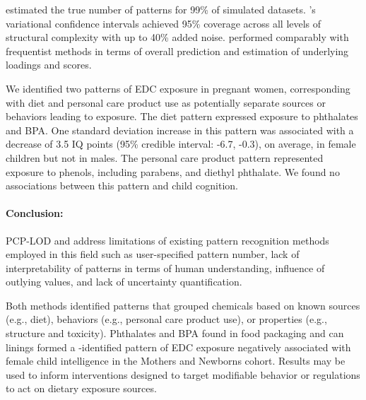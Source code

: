 {\bnmf estimated the true number of patterns for 99\% of simulated datasets. \bnmfc's variational confidence intervals achieved 95\% coverage across all levels of structural complexity with up to 40\% added noise. \bnmf performed comparably with frequentist methods in terms of overall prediction and estimation of underlying loadings and scores. 

We identified two patterns of EDC exposure in pregnant women, corresponding with diet and personal care product use as potentially separate sources or behaviors leading to exposure. The diet pattern expressed exposure to phthalates and BPA. One standard deviation increase in this pattern was associated with a decrease of 3.5 IQ points (95\% credible interval: -6.7, -0.3), on average, in female children but not in males. The personal care product pattern represented exposure to phenols, including parabens, and diethyl phthalate. We found no associations between this pattern and child cognition.

\paragraph{Conclusion:}	
PCP-LOD and \bnmf address limitations of existing pattern recognition methods employed in this field such as user-specified pattern number, lack of interpretability of patterns in terms of human understanding, influence of outlying values, and lack of uncertainty quantification. 

Both methods identified patterns that grouped chemicals based on known sources (e.g., diet), behaviors (e.g., personal care product use), or properties (e.g., structure and toxicity). Phthalates and BPA found in food packaging and can linings formed a \bnmfc-identified pattern of EDC exposure negatively associated with female child intelligence in the Mothers and Newborns cohort. Results may be used to inform interventions designed to target modifiable behavior or regulations to act on dietary exposure sources.
} %

